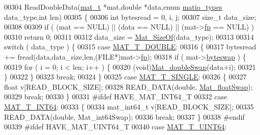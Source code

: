 \begin{DoxyCode}
00304 ReadDoubleData(\hyperlink{struct__mat__t}{mat\_t} *mat,\textcolor{keywordtype}{double} *data,\textcolor{keyword}{enum} \hyperlink{group___m_a_t_gacf7b3b879282b7ab3a51190e49bf3453}{matio\_types} data\_type,\textcolor{keywordtype}{int} len)
00305 \{
00306     \textcolor{keywordtype}{int} bytesread = 0, i, j;
00307     \textcolor{keywordtype}{size\_t} data\_size;
00308 
00309     \textcolor{keywordflow}{if} ( (mat == NULL) || (data == NULL) || (mat->\hyperlink{struct__mat__t_a85f562e407ca9ad4d2a6e14f839432b7}{fp} == NULL) )
00310         \textcolor{keywordflow}{return} 0;
00311 
00312     data\_size = \hyperlink{group__mat__util_gab6774aabdc124c540c1e7686d0804940}{Mat\_SizeOf}(data\_type);
00313 
00314     \textcolor{keywordflow}{switch} ( data\_type ) \{
00315         \textcolor{keywordflow}{case} \hyperlink{group___m_a_t_ggacf7b3b879282b7ab3a51190e49bf3453a31e721ecf7e188196f83c32838288797}{MAT\_T\_DOUBLE}:
00316         \{
00317             bytesread += fread(data,data\_size,len,(FILE*)mat->\hyperlink{struct__mat__t_a85f562e407ca9ad4d2a6e14f839432b7}{fp});
00318             \textcolor{keywordflow}{if} ( mat->\hyperlink{struct__mat__t_a99d207977af5e04941ace56d71817a40}{byteswap} ) \{
00319                 \textcolor{keywordflow}{for} ( i = 0; i < len; i++ ) \{
00320                     (void)\hyperlink{endian_8c_a7f548ab23c3b06fa90ef646ed43dc558}{Mat\_doubleSwap}(data+i);
00321                 \}
00322             \}
00323             \textcolor{keywordflow}{break};
00324         \}
00325         \textcolor{keywordflow}{case} \hyperlink{group___m_a_t_ggacf7b3b879282b7ab3a51190e49bf3453a3a3657d40e9212c923d9b9d03531b64c}{MAT\_T\_SINGLE}:
00326         \{
00327             \textcolor{keywordtype}{float} v[READ\_BLOCK\_SIZE];
00328             READ\_DATA(\textcolor{keywordtype}{double}, \hyperlink{endian_8c_aec590b585dd84bbbae74a857922fced2}{Mat\_floatSwap});
00329             \textcolor{keywordflow}{break};
00330         \}
00331 \textcolor{preprocessor}{#ifdef HAVE\_MAT\_INT64\_T}
00332         \textcolor{keywordflow}{case} \hyperlink{group___m_a_t_ggacf7b3b879282b7ab3a51190e49bf3453a9e825b5d18b8f946eaf2b4b57e51c145}{MAT\_T\_INT64}:
00333         \{
00334             mat\_int64\_t v[READ\_BLOCK\_SIZE];
00335             READ\_DATA(\textcolor{keywordtype}{double}, Mat\_int64Swap);
00336             \textcolor{keywordflow}{break};
00337         \}
00338 \textcolor{preprocessor}{#endif}
00339 \textcolor{preprocessor}{#ifdef HAVE\_MAT\_UINT64\_T}
00340         \textcolor{keywordflow}{case} \hyperlink{group___m_a_t_ggacf7b3b879282b7ab3a51190e49bf3453a45547932c46be27118abe08302d7e29f}{MAT\_T\_UINT64}:

\end{DoxyCode}

